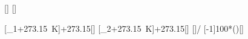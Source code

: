 [\degreeCelsius]
[\degreeCelsius]

[\vartheta_1+\SI{273.15}{\kelvin}]{\thEiX+273.15}[\kelvin]
[\vartheta_2+\SI{273.15}{\kelvin}]{\thZwX+273.15}[\kelvin]
[]{\TEiX/\TZwX}
[-1]{100*()}[\percent]
